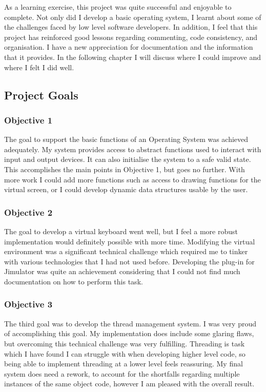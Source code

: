 As a learning exercise, this project was quite successful and enjoyable to complete. Not only did I develop a basic operating system, I learnt about some of the challenges faced by low level software developers. In addition, I feel that this project has reinforced good lessons regarding commenting, code consistency, and organisation. I have a new appreciation for documentation and the information that it provides. In the following chapter I will discuss where I could improve and where I felt I did well. 
\subsection{Project Goals}
\subsubsection{Objective 1}
The goal to support the basic functions of an Operating System was achieved adequately. My system provides access to abstract functions used to interact with input and output devices. It can also initialise the system to a safe valid state. This accomplishes the main points in Objective 1, but goes no further. With more work I could add more functions such as access to drawing functions for the virtual screen, or I could develop dynamic data structures usable by the user.
\subsubsection{Objective 2}
The goal to develop a virtual keyboard went well, but I feel a more robust implementation would definitely possible with more time. Modifying the virtual environment was a significant technical challenge which required me to tinker with various technologies that I had not used before. Developing the plug-in for Jimulator was quite an achievement considering that I could not find much documentation on how to perform this task. 
\subsubsection{Objective 3}
The third goal was to develop the thread management system. I was very proud of accomplishing this goal. My implementation does include some glaring flaws, but overcoming this technical challenge was very fulfilling. Threading is task which I have found I can struggle with when developing higher level code, so being able to implement threading at a lower level feels reassuring. My final system does need a rework, to account for the shortfalls regarding multiple instances of the same object code, however I am pleased with the overall result. 









